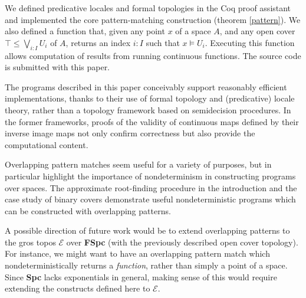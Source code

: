 \documentclass[conference]{IEEEtran}
\begin{document}
We defined predicative locales and formal topologies in the Coq proof assistant and implemented the core pattern-matching construction (theorem \ref{pattern}). We also defined a function that, given any point $x$ of a space $A$, and any open cover $\top \le \bigvee_{i : I} U_i$ of $A$, returns an index $i : I$ such that $x \models U_i$. Executing this function allows computation of results from running continuous functions. The source code is submitted with this paper.

The programs described in this paper conceivably support reasonably efficient implementations, thanks to their use of formal topology and (predicative) locale theory, rather than a topology framework based on semidecision procedures. In the former frameworks, proofs of the validity of continuous maps defined by their inverse image maps not only confirm correctness but also provide the computational content.

Overlapping pattern matches seem useful for a variety of purposes, but in particular highlight the  importance of nondeterminism in constructing programs over spaces. The approximate root-finding procedure in the introduction and the case study of binary covers demonstrate useful nondeterministic programs which can be constructed with overlapping patterns.

A possible direction of future work would be to extend overlapping patterns to the gros topos $\mathcal{E}$ over \textbf{FSpc} (with the previously described open cover topology). For instance, we might want to have an overlapping pattern match which nondeterministically returns a \emph{function}, rather than simply a point of a space. Since \textbf{Spc} lacks exponentials in general, making sense of this would require extending the constructs defined here to $\mathcal{E}$.









\end{document}
